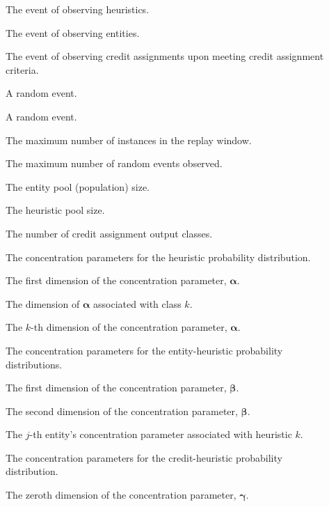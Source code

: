 \begin{description}
	\item [\parbox{2cm}{$\boldsymbol{H}$}] The event of observing heuristics.
	\item [\parbox{2cm}{$\boldsymbol{E}$}] The event of observing entities.
	\item [\parbox{2cm}{$\boldsymbol{C}$}] The event of observing credit assignments upon meeting credit assignment criteria.
	\item [\parbox{2cm}{$A$}] A random event.
	\item [\parbox{2cm}{$B$}] A random event.
	\item [\parbox{2cm}{$I$}] The maximum number of instances in the replay window.
	\item [\parbox{2cm}{$N$}] The maximum number of random events observed.
	\item [\parbox{2cm}{$J$}] The entity pool (population) size.
	\item [\parbox{2cm}{$K$}] The heuristic pool size.
	\item [\parbox{2cm}{$L$}] The number of credit assignment output classes.
	\item [\parbox{2cm}{$\boldsymbol{\alpha}$}] The concentration parameters for the heuristic probability distribution.
	\item [\parbox{2cm}{$\alpha_{1}$}] The first dimension of the concentration parameter, $\boldsymbol{\alpha}$.
	\item [\parbox{2cm}{$\alpha_{k}$}] The dimension of $\boldsymbol{\alpha}$ associated with class $k$.
	\item [\parbox{2cm}{$\alpha_{K}$}] The $k$-th dimension of the concentration parameter, $\boldsymbol{\alpha}$.
	\item [\parbox{2cm}{$\boldsymbol{\beta}$}] The concentration parameters for the entity-heuristic probability distributions.
	\item [\parbox{2cm}{$\beta_{1}$}] The first dimension of the concentration parameter, $\boldsymbol{\beta}$.
	\item [\parbox{2cm}{$\beta_{2}$}] The second dimension of the concentration parameter, $\boldsymbol{\beta}$.
	\item [\parbox{2cm}{$\beta_{j,k}$}] The $j$-th entity's concentration parameter associated with heuristic $k$.
	\item [\parbox{2cm}{$\boldsymbol{\gamma}$}] The concentration parameters for the credit-heuristic probability distribution.
	\item [\parbox{2cm}{$\gamma_{0}$}] The zeroth dimension of the concentration parameter, $\boldsymbol{\gamma}$.

\end{description}
